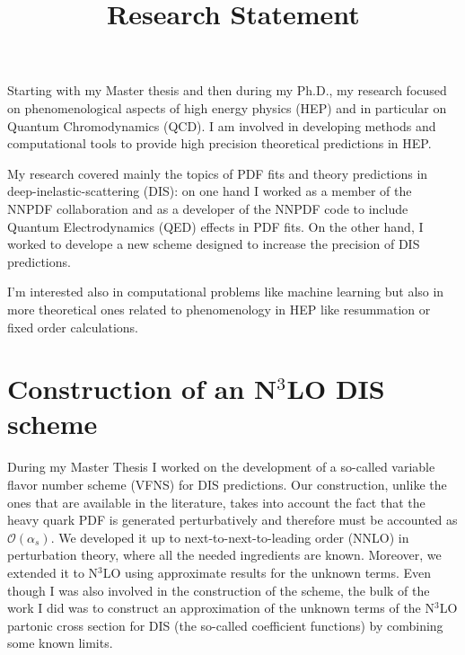 \documentclass[11pt,a4paper]{moderncv}        %
\title{Research Statement}
\begin{document}
\makecvtitle

Starting with my Master thesis and then during my Ph.D., my research focused on phenomenological aspects of high energy physics (HEP)
and in particular on Quantum Chromodynamics (QCD).
I am involved in developing methods and computational tools to provide high precision theoretical predictions in HEP.


My research covered mainly the topics of PDF fits and theory predictions in deep-inelastic-scattering (DIS):
on one hand I worked as a member of the NNPDF collaboration and as a developer of the NNPDF code to include
Quantum Electrodynamics (QED) effects in PDF fits.
On the other hand, I worked to develope a new scheme designed to increase the precision of DIS predictions.

I'm interested also in computational problems like machine learning but also in more theoretical ones related to phenomenology in 
HEP like resummation or fixed order calculations.

\section{Construction of an N$^3$LO DIS scheme}

During my Master Thesis I worked on the development of a so-called variable flavor number scheme (VFNS) 
for DIS predictions.
%
%
Our construction, unlike the ones that are available in the literature, takes into account the fact that the heavy quark PDF is generated
perturbatively and therefore must be accounted as $\mathcal{O}(\alpha_s)$.
%
We developed it up to next-to-next-to-leading order (NNLO) in perturbation theory, where all the needed ingredients are known.
Moreover, we extended it to N$^3$LO using approximate results for the unknown terms.
Even though I was also involved in the construction of the scheme, the bulk of the work I did was to
construct an approximation of the unknown terms of the N$^3$LO partonic cross section for DIS (the so-called coefficient functions) by
combining some known limits.
\end{document}
